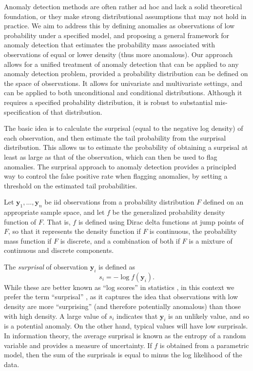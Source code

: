 \documentclass[
  12pt]{article}
\theoremstyle{definition}
\theoremstyle{plain}
\theoremstyle{plain}
\theoremstyle{plain}
\theoremstyle{remark}
\begin{document}
Anomaly detection methods are often rather ad hoc and lack a solid
theoretical foundation, or they make strong distributional assumptions
that may not hold in practice. We aim to address this by defining
anomalies as observations of low probability under a specified model,
and proposing a general framework for anomaly detection that estimates
the probability mass associated with observations of equal or lower
density (thus more anomalous). Our approach allows for a unified
treatment of anomaly detection that can be applied to any anomaly
detection problem, provided a probability distribution can be defined on
the space of observations. It allows for univariate and multivariate
settings, and can be applied to both unconditional and conditional
distributions. Although it requires a specified probability
distribution, it is robust to substantial mis-specification of that
distribution.

The basic idea is to calculate the surprisal (equal to the negative log
density) of each observation, and then estimate the tail probability
from the surprisal distribution. This allows us to estimate the
probability of obtaining a surprisal at least as large as that of the
observation, which can then be used to flag anomalies. The surprisal
approach to anomaly detection provides a principled way to control the
false positive rate when flagging anomalies, by setting a threshold on
the estimated tail probabilities.

Let \(\bm{y}_1,\dots,\bm{y}_n\) be iid observations from a probability
distribution \(F\) defined on an appropriate sample space, and let \(f\)
be the generalized probability density function of \(F\). That is, \(f\)
is defined using Dirac delta functions at jump points of \(F\), so that
it represents the density function if \(F\) is continuous, the
probability mass function if \(F\) is discrete, and a combination of
both if \(F\) is a mixture of continuous and discrete components.

The \emph{surprisal} of observation \(\bm{y}_i\) is defined as
\citep{Stone2022} \[
s_i=-\log f(\bm{y}_i).
\] While these are better known as ``log scores'' in statistics
\citep{Good1952-zw}, in this context we prefer the term ``surprisal''
\citep[coined by][]{Tribus61}, as it captures the idea that observations
with low density are more ``surprising'' (and therefore potentially
anomalous) than those with high density. A large value of \(s_i\)
indicates that \(\bm{y}_i\) is an unlikely value, and so is a potential
anomaly. On the other hand, typical values will have low surprisals. In
information theory, the average surprisal is known as the entropy of a
random variable \citep{Cover2006, Stone2022} and provides a measure of
uncertainty. If \(f\) is obtained from a parametric model, then the sum
of the surprisals is equal to minus the log likelihood of the data.
\end{document}
